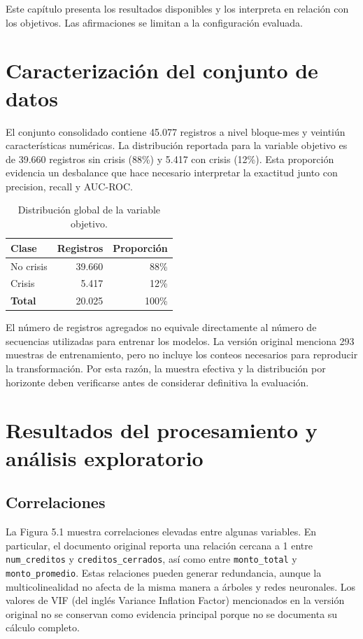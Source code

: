 Este capítulo presenta los resultados disponibles y los interpreta en relación con los objetivos. Las afirmaciones se limitan a la configuración evaluada.

\section{Caracterización del conjunto de datos}

El conjunto consolidado contiene 45.077 registros a nivel bloque-mes y veintiún características numéricas. La distribución reportada para la variable objetivo es de 39.660 registros sin crisis (88\%) y 5.417 con crisis (12\%). Esta proporción evidencia un desbalance que hace necesario interpretar la exactitud junto con precision, recall y AUC-ROC.

\begin{table}[H]
    \centering
    \begin{tabular}{|l|r|r|}
    \hline
        \textbf{Clase} & \textbf{Registros} & \textbf{Proporción} \\
    \hline
        No crisis & 39.660 & 88\% \\
    \hline
        Crisis & 5.417 & 12\% \\
    \hline
        \textbf{Total} & 20.025 & 100\% \\
    \hline
    \end{tabular}
    \caption{Distribución global de la variable objetivo.}
    \label{tab:dist_objetivo}
    \end{table}

El número de registros agregados no equivale directamente al número de secuencias utilizadas para entrenar los modelos. La versión original menciona 293 muestras de entrenamiento, pero no incluye los conteos necesarios para reproducir la transformación. Por esta razón, la muestra efectiva y la distribución por horizonte deben verificarse antes de considerar definitiva la evaluación.

\section{Resultados del procesamiento y \newline análisis exploratorio}

\subsection{Correlaciones}

La Figura 5.1 muestra correlaciones elevadas entre algunas variables. En particular, el documento original reporta una relación cercana a 1 entre \texttt{num\_creditos} y \texttt{creditos\_cerrados}, así como entre \texttt{monto\_total} y \texttt{monto\_promedio}. Estas relaciones pueden generar redundancia, aunque la multicolinealidad no afecta de la misma manera a árboles y redes neuronales. Los valores de VIF (del inglés Variance Inflation Factor) mencionados en la versión original no se conservan como evidencia principal porque no se documenta su cálculo completo.

